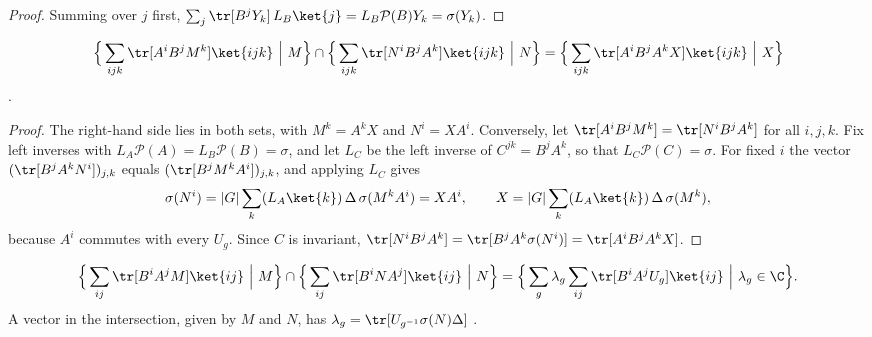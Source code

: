 \begin{proof}\leanok
    Summing over $j$ first, $\sum_j\tr[B^jY_k]\,L_B\ket{j}
        =L_B\mathcal{P}(B)Y_k=\sigma(Y_k)$.
\end{proof}

\begin{lemma}%
    \label{thm:peps_mps_g_injective_intersection}
    \leanok
    \begin{align*}
        \Big\{\sum_{ijk}\tr[A^iB^jM^k]\ket{ijk}\ \Big|\ M\Big\}\cap
        \Big\{\sum_{ijk}\tr[N^iB^jA^k]\ket{ijk}\ \Big|\ N\Big\}
        =\Big\{\sum_{ijk}\tr[A^iB^jA^kX]\ket{ijk}\ \Big|\ X\Big\}
    \end{align*}
    \cite[Section~``Parent Hamiltonians'']{Schuch2010PEPS}.
\end{lemma}

\begin{proof}\leanok
    The right-hand side lies in both sets, with $M^k=A^kX$ and $N^i=XA^i$.
    Conversely, let $\tr[A^iB^jM^k]=\tr[N^iB^jA^k]$ for all $i,j,k$. Fix
    left inverses with $L_A\mathcal{P}(A)=L_B\mathcal{P}(B)=\sigma$, and let
    $L_C$ be the left inverse of $C^{jk}=B^jA^k$, so that
    $L_C\mathcal{P}(C)=\sigma$. For fixed $i$ the vector
    $(\tr[B^jA^kN^i])_{j,k}$ equals $(\tr[B^jM^kA^i])_{j,k}$, and applying
    $L_C$ gives
    \begin{align*}
        \sigma(N^i)=|G|\sum_k(L_A\ket{k})\,\Delta\,\sigma(M^kA^i)=XA^i,
        \qquad X=|G|\sum_k(L_A\ket{k})\,\Delta\,\sigma(M^k),
    \end{align*}
    because $A^i$ commutes with every $U_g$. Since $C$ is invariant,
    $\tr[N^iB^jA^k]=\tr[B^jA^k\sigma(N^i)]=\tr[A^iB^jA^kX]$.
\end{proof}

\begin{lemma}%
    \label{thm:peps_mps_g_injective_closure}
    \leanok
    \begin{align*}
        \Big\{\sum_{ij}\tr[B^iA^jM]\ket{ij}\ \Big|\ M\Big\}\cap
        \Big\{\sum_{ij}\tr[B^iNA^j]\ket{ij}\ \Big|\ N\Big\}
        =\Big\{\sum_g\lambda_g\sum_{ij}\tr[B^iA^jU_g]\ket{ij}\ \Big|\
        \lambda_g\in\C\Big\}.
    \end{align*}
    A vector in the intersection, given by $M$ and $N$, has
    $\lambda_g=\tr[U_{g^{-1}}\sigma(N)\Delta]$
    \cite[Section~``Parent Hamiltonians'']{Schuch2010PEPS}.
\end{lemma}

